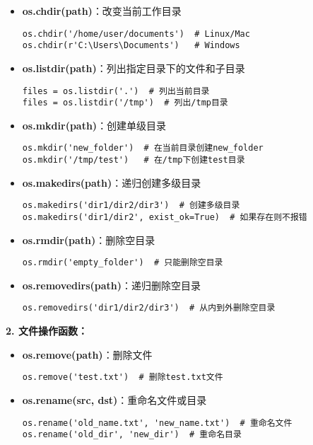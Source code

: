 \begin{mdframed}
\begin{itemize}
    \item \textbf{os.chdir(path)}：改变当前工作目录
    \begin{lstlisting}
os.chdir('/home/user/documents')  # Linux/Mac
os.chdir(r'C:\Users\Documents')   # Windows
    \end{lstlisting}

    \item \textbf{os.listdir(path)}：列出指定目录下的文件和子目录
    \begin{lstlisting}
files = os.listdir('.')  # 列出当前目录
files = os.listdir('/tmp')  # 列出/tmp目录
    \end{lstlisting}

    \item \textbf{os.mkdir(path)}：创建单级目录
    \begin{lstlisting}
os.mkdir('new_folder')  # 在当前目录创建new_folder
os.mkdir('/tmp/test')   # 在/tmp下创建test目录
    \end{lstlisting}

    \item \textbf{os.makedirs(path)}：递归创建多级目录
    \begin{lstlisting}
os.makedirs('dir1/dir2/dir3')  # 创建多级目录
os.makedirs('dir1/dir2', exist_ok=True)  # 如果存在则不报错
    \end{lstlisting}

    \item \textbf{os.rmdir(path)}：删除空目录
    \begin{lstlisting}
os.rmdir('empty_folder')  # 只能删除空目录
    \end{lstlisting}

    \item \textbf{os.removedirs(path)}：递归删除空目录
    \begin{lstlisting}
os.removedirs('dir1/dir2/dir3')  # 从内到外删除空目录
    \end{lstlisting}
  \end{itemize}

  \textbf{2. 文件操作函数：}
  \begin{itemize}
    \item \textbf{os.remove(path)}：删除文件
    \begin{lstlisting}
os.remove('test.txt')  # 删除test.txt文件
    \end{lstlisting}

    \item \textbf{os.rename(src, dst)}：重命名文件或目录
    \begin{lstlisting}
os.rename('old_name.txt', 'new_name.txt')  # 重命名文件
os.rename('old_dir', 'new_dir')  # 重命名目录
    \end{lstlisting}


\end{itemize}
\end{mdframed}
